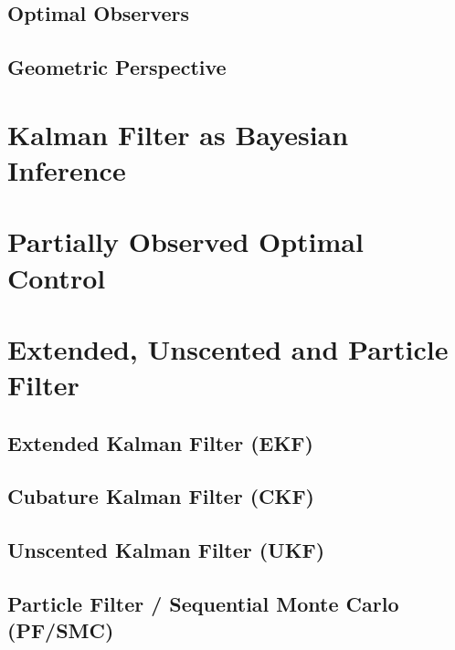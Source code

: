 		\subsection{Optimal Observers} %

		\subsection{Geometric Perspective} %

	\section{Kalman Filter as Bayesian Inference} %

	\section{Partially Observed Optimal Control} %

	\section{Extended, Unscented and Particle Filter} %

		\subsection{Extended Kalman Filter (EKF)} %

		\subsection{Cubature Kalman Filter (CKF)} %

		\subsection{Unscented Kalman Filter (UKF)} %

		\subsection{Particle Filter / Sequential Monte Carlo (PF/SMC)} %

